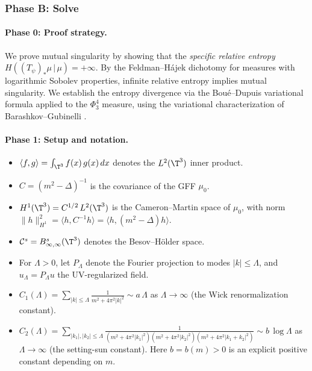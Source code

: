 \subsubsection*{Phase B: Solve}

\paragraph{Phase 0: Proof strategy.}
We prove mutual singularity by showing that the \emph{specific relative entropy}
$H((T_\psi)_*\mu \,|\, \mu) = +\infty$. By the Feldman--H\'ajek dichotomy
for measures with logarithmic Sobolev properties, infinite relative entropy
implies mutual singularity. We establish the entropy divergence via the
Bou\'e--Dupuis variational formula applied to the $\Phi^4_3$ measure,
using the variational characterization of Barashkov--Gubinelli \cite{BG20}.

\paragraph{Phase 1: Setup and notation.}

\begin{definition}[Conventions]\label{def:p1-conventions}
\begin{itemize}
\item $\langle f, g \rangle = \int_{\T^3} f(x)\,g(x)\,dx$ denotes the
  $L^2(\T^3)$ inner product.
\item $C = (m^2 - \Delta)^{-1}$ is the covariance of the GFF $\mu_0$.
\item $H^1(\T^3) = C^{1/2}\,L^2(\T^3)$ is the Cameron--Martin space of $\mu_0$,
  with norm $\|h\|_{H^1}^2 = \langle h, C^{-1}h \rangle = \langle h, (m^2 - \Delta)h\rangle$.
\item $\mathcal{C}^s = B^s_{\infty,\infty}(\T^3)$ denotes the Besov--H\"older space.
\item For $\Lambda > 0$, let $P_\Lambda$ denote the Fourier projection to
  modes $|k| \leq \Lambda$, and $u_\Lambda = P_\Lambda u$ the UV-regularized field.
\item $C_1(\Lambda) = \sum_{|k| \leq \Lambda} \frac{1}{m^2 + 4\pi^2|k|^2}
  \sim a\,\Lambda$ as $\Lambda \to \infty$ (the Wick renormalization constant).
\item $C_2(\Lambda) = \sum_{|k_1|,|k_2| \leq \Lambda}
  \frac{1}{(m^2+4\pi^2|k_1|^2)(m^2+4\pi^2|k_2|^2)(m^2+4\pi^2|k_1+k_2|^2)}
  \sim b\,\log\Lambda$ as $\Lambda \to \infty$ (the setting-sun constant).
  Here $b = b(m) > 0$ is an explicit positive constant depending on $m$.
\end{itemize}
\end{definition}

